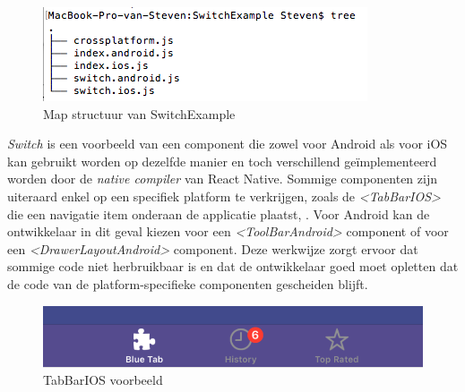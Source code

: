 		\begin{figure}%
		\includegraphics[width=\columnwidth]{img/switch.png}%
		\caption{Map structuur van SwitchExample}%
		\label{fig:switch}%
		\end{figure}
\emph{Switch} is een voorbeeld van een component die zowel voor Android als voor iOS kan gebruikt worden op dezelfde manier en toch verschillend geïmplementeerd worden door de \emph{native compiler} van React Native. Sommige componenten zijn uiteraard enkel op een specifiek platform te verkrijgen, zoals de \emph{<TabBarIOS>} die een navigatie item onderaan de applicatie plaatst, . Voor Android kan de ontwikkelaar in dit geval kiezen voor een \emph{<ToolBarAndroid>} component of voor een \emph{<DrawerLayoutAndroid>} component. Deze werkwijze zorgt ervoor dat sommige code niet herbruikbaar is en dat de ontwikkelaar goed moet opletten dat de code van de platform-specifieke componenten gescheiden blijft.  
																
																\begin{figure}%
																\centering
																\includegraphics[width=0.5\columnwidth]{img/tabbarios}%
																\caption{TabBarIOS voorbeeld}%
																\label{fig:tabbar}%
																\end{figure}
																
